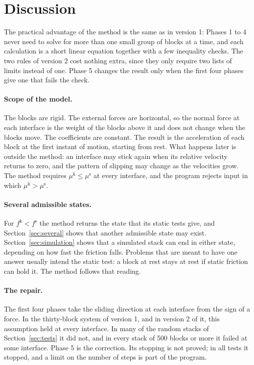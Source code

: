 \documentclass[11pt,a4paper]{article}
\newcommand{\fs}{f^{\mathrm{s}}}
\newcommand{\fkin}{f^{\mathrm{k}}}
\newcommand{\mus}{\mu^{\mathrm{s}}}
\newcommand{\muk}{\mu^{\mathrm{k}}}
\begin{document}
\section{Discussion}\label{sec:discussion}

The practical advantage of the method is the same as in version 1: Phases 1 to 4 never need to solve for more than one small group of blocks at a time, and each calculation is a short linear equation together with a few inequality checks. The two rules of version 2 cost nothing extra, since they only require two lists of limits instead of one. Phase 5 changes the result only when the first four phases give one that fails the check.

\paragraph{Scope of the model.} The blocks are rigid. The external forces are horizontal, so the normal force at each interface is the weight of the blocks above it and does not change when the blocks move. The coefficients are constant. The result is the acceleration of each block at the first instant of motion, starting from rest. What happens later is outside the method: an interface may stick again when its relative velocity returns to zero, and the pattern of slipping may change as the velocities grow. The method requires $\muk\le\mus$ at every interface, and the program rejects input in which $\muk>\mus$.

\paragraph{Several admissible states.} For $\fkin<\fs$ the method returns the state that its static tests give, and Section~\ref{sec:several} shows that another admissible state may exist. Section~\ref{sec:simulation} shows that a simulated stack can end in either state, depending on how fast the friction falls. Problems that are meant to have one answer usually intend the static test: a block at rest stays at rest if static friction can hold it. The method follows that reading.

\paragraph{The repair.} The first four phases take the sliding direction at each interface from the sign of a force. In the thirty-block system of version 1, and in version 2 of it, this assumption held at every interface. In many of the random stacks of Section~\ref{sec:tests} it did not, and in every stack of 500 blocks or more it failed at some interface. Phase 5 is the correction. Its stopping is not proved; in all tests it stopped, and a limit on the number of steps is part of the program.
\end{document}
